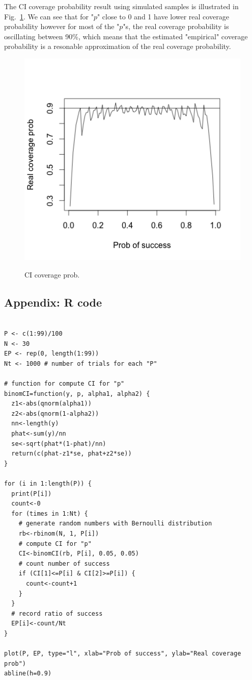 \documentclass[12pt]{article}
\begin{document}
The CI coverage probability result using simulated samples is illustrated in Fig.~\ref{fig:img1}. We can see that for "$p$" close to 0 and 1 have lower real coverage probability however for most of the "$p$"s, the real coverage probability is oscillating between 90\%, which means that the estimated "empirical" coverage probability is a resonable approximation of the real coverage probability.


\begin{figure}[hptb]
	\centering
{\includegraphics[scale=1]{Rplot01.png}} \;
\caption{CI coverage prob.}
	\label{fig:img1}
\end{figure}


\subsection*{Appendix: R code}
\begin{verbatim}

P <- c(1:99)/100
N <- 30    
EP <- rep(0, length(1:99)) 
Nt <- 1000 # number of trials for each "P"

# function for compute CI for "p"
binomCI=function(y, p, alpha1, alpha2) {
  z1<-abs(qnorm(alpha1))
  z2<-abs(qnorm(1-alpha2))
  nn<-length(y)
  phat<-sum(y)/nn
  se<-sqrt(phat*(1-phat)/nn)
  return(c(phat-z1*se, phat+z2*se))
}

for (i in 1:length(P)) {
  print(P[i])
  count<-0
  for (times in 1:Nt) {
    # generate random numbers with Bernoulli distribution
    rb<-rbinom(N, 1, P[i])
    # compute CI for "p"
    CI<-binomCI(rb, P[i], 0.05, 0.05)
    # count number of success
    if (CI[1]<=P[i] & CI[2]>=P[i]) {
      count<-count+1
    }
  }
  # record ratio of success
  EP[i]<-count/Nt
}

plot(P, EP, type="l", xlab="Prob of success", ylab="Real coverage prob")
abline(h=0.9)


\end{verbatim}
\end{document}
